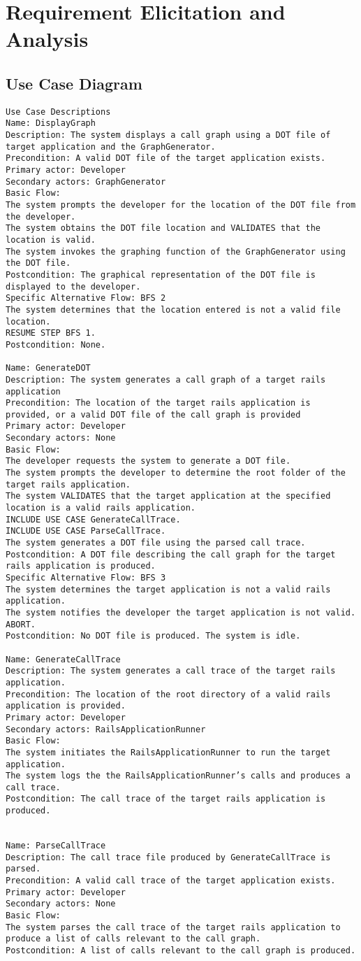 \chapter{Requirement Elicitation and Analysis}
\section{Use Case Diagram}

\begin{verbatim}
Use Case Descriptions
Name: DisplayGraph
Description: The system displays a call graph using a DOT file of target application and the GraphGenerator.
Precondition: A valid DOT file of the target application exists.
Primary actor: Developer
Secondary actors: GraphGenerator
Basic Flow:
The system prompts the developer for the location of the DOT file from the developer.
The system obtains the DOT file location and VALIDATES that the location is valid.
The system invokes the graphing function of the GraphGenerator using the DOT file.
Postcondition: The graphical representation of the DOT file is displayed to the developer.
Specific Alternative Flow: BFS 2
The system determines that the location entered is not a valid file location.
RESUME STEP BFS 1.
Postcondition: None.

Name: GenerateDOT
Description: The system generates a call graph of a target rails application
Precondition: The location of the target rails application is provided, or a valid DOT file of the call graph is provided
Primary actor: Developer
Secondary actors: None
Basic Flow:
The developer requests the system to generate a DOT file.
The system prompts the developer to determine the root folder of the target rails application.
The system VALIDATES that the target application at the specified location is a valid rails application.
INCLUDE USE CASE GenerateCallTrace.
INCLUDE USE CASE ParseCallTrace.
The system generates a DOT file using the parsed call trace.
Postcondition: A DOT file describing the call graph for the target rails application is produced.
Specific Alternative Flow: BFS 3
The system determines the target application is not a valid rails application.
The system notifies the developer the target application is not valid.
ABORT.
Postcondition: No DOT file is produced. The system is idle.

Name: GenerateCallTrace
Description: The system generates a call trace of the target rails application.
Precondition: The location of the root directory of a valid rails application is provided.
Primary actor: Developer
Secondary actors: RailsApplicationRunner
Basic Flow:
The system initiates the RailsApplicationRunner to run the target application.
The system logs the the RailsApplicationRunner’s calls and produces a call trace.
Postcondition: The call trace of the target rails application is produced.


Name: ParseCallTrace
Description: The call trace file produced by GenerateCallTrace is parsed.
Precondition: A valid call trace of the target application exists.
Primary actor: Developer
Secondary actors: None
Basic Flow: 
The system parses the call trace of the target rails application to produce a list of calls relevant to the call graph.
Postcondition: A list of calls relevant to the call graph is produced.
\end{verbatim}
